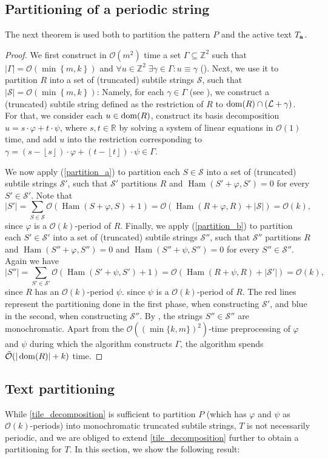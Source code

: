 \documentclass[11pt, letterpaper]{article}
\theoremstyle{plain}
\theoremstyle{definition}
\theoremstyle{remark}
\newcommand{\R}{\mathbb{R}}
\newcommand{\Z}{\mathbb{Z}}
\renewcommand{\O}{\mathcal{O}}
\newcommand{\tO}{\tilde{\mathcal{O}}}
\renewcommand{\S}{\mathcal{S}}
\renewcommand{\L}{\mathcal{L}}
\renewcommand{\phi}{\varphi}
\newcommand{\floor}[1]{\left\lfloor #1 \right\rfloor}
\newcommand{\set}[1]{\left\lbrace #1 \right\rbrace}
\DeclareMathOperator*{\Ham}{Ham}
\begin{document}
\subsection{Partitioning of a periodic string}
The next theorem is used both to partition the pattern $P$ and the active text $T_\mathbf{a}$.

\tileDecomposition
\begin{proof}
We first construct in $\O(m^2)$ time a set $\Gamma \subseteq \Z^2$ such that $|\Gamma| = \O(\min\set{m, k})$ and $\forall u \in \Z^2 \; \exists \gamma \in \Gamma : u \equiv \gamma$ (). Next, we use it to partition $R$ into a set of (truncated) subtile strings $\S$, such that $|\S| = \O(\min\set{m, k})$: Namely, for each $\gamma \in \Gamma$ (see ), we construct a (truncated) subtile string defined as the restriction of $R$ to $\d{R} \cap (\L + \gamma)$. For that, we consider each $u \in \operatorname*{dom}(R)$, construct its basis decomposition $u = s\cdot \phi + t\cdot \psi$, where $s,t\in \R$ by solving a system of linear equations in $\O(1)$ time, and add $u$ into the restriction corresponding to $\gamma = (s-\floor{s}) \cdot \phi + (t-\floor{t}) \cdot \psi \in \Gamma$. 

	We now apply  (\ref{partition_a}) to partition each $S \in \S$  into a set of (truncated) subtile strings $\S'$, such that $\S'$ partitions $R$ and $\Ham(S' + \phi, S') = 0$ for every $S' \in \S'$.
	Note that
	\[ |S'| = \sum_{S \in \S} \O(\Ham(S + \phi, S) + 1) = \O(\Ham(R + \phi, R) + |\S|) = \O(k),\]
	since $\phi$ is a $\O(k)$-period of $R$.
	Finally, we apply   (\ref{partition_b}) to partition each $S' \in \S'$ into a set of (truncated) subtile strings $\S''$, such that $\S''$ partitions $R$ and $\Ham(S'' + \phi, S'') = 0$ and $\Ham(S'' + \psi, S'') = 0$ for every $S'' \in \S''$.
	Again we have
	\[ |S''| = \sum_{S' \in \S'} \O(\Ham(S' + \psi, S') + 1) = \O(\Ham(R + \psi, R) + |\S'|) = \O(k),\]
	since $R$ has an $\O(k)$-period $\psi$.
	since $\psi$ is a $\O(k)$-period of $R$.
	The red lines represent the partitioning done in the first phase, when constructing $\S'$, and blue in the second, when constructing $\S''$.
	By , the strings $S'' \in \S''$ are monochromatic.
	Apart from the $\O((\min\{k,m\})^2)$-time preprocessing of $\phi$ and $\psi$ during which the algorithm constructs $\Gamma$, the algorithm spends $\tO(|\d{R}| + k)$ time.
\end{proof}


\subsection{Text partitioning}
While \cref{tile_decomposition} is sufficient to partition $P$ (which has $\phi$ and $\psi$ as $\O(k)$-periods) into monochromatic truncated subtile strings, $T$ is not necessarily periodic, and we are obliged to extend \cref{tile_decomposition} further to obtain a partitioning for $T$. In this section, we show the following result:
\end{document}
